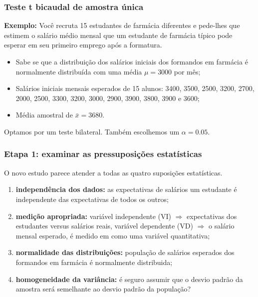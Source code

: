 \documentclass[11pt]{beamer}
\begin{document}
\begin{frame}
\frametitle{Teste t bicaudal de amostra única}

\textbf{Exemplo:} Você recruta 15 estudantes de farmácia diferentes e pede-lhes que estimem o salário médio mensal que um estudante de farmácia típico pode esperar em seu primeiro emprego após a formatura.
\begin{itemize}
\item Sabe se que a distribuição dos salários iniciais dos formandos em farmácia é normalmente distribuída com uma média $\mu = 3000$ por mês;
\item
   Salários iniciais mensais esperados de 15 alunos: 3400, 3500, 2500, 3200, 2700, 2000, 2500, 3300, 3200, 3000, 2900, 3900, 3800, 3900 e 3600;
\item
  Média amostral de $\bar{x} = 3680$.
\end{itemize}

Optamos por um teste bilateral. Também escolhemos um \(\alpha=0.05\).

\end{frame}



\begin{frame}
\frametitle{Etapa 1: examinar as pressuposições estatísticas}

O novo estudo parece atender a todas as quatro suposições estatísticas.

\begin{enumerate}
\item \textbf{independência dos dados:} as expectativas de salários um estudante é independente das expectativas de todos os outros;
\item \textbf{medição apropriada:} variável independente (VI) \(\Rightarrow\) expectativas dos estudantes versus salários reais, variável dependente (VD) \(\Rightarrow\) o salário mensal esperado, é medido em como uma variável quantitativa;
\item \textbf{normalidade das distribuições:} população de salários esperados dos formandos em farmácia é normalmente distribuida;
\item \textbf{homogeneidade da variância:} é seguro assumir que o desvio padrão da amostra será semelhante ao desvio padrão da população?
\end{enumerate}

\end{frame}
\end{document}
